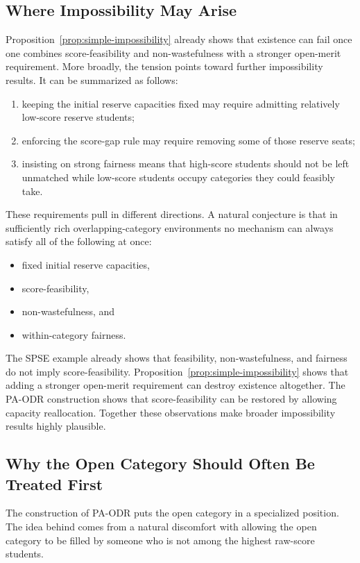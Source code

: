 \documentclass[12pt]{article}
\newcommand{\1}{\mathbf{1}}
\begin{document}
\subsection{Where Impossibility May Arise}
Proposition~\ref{prop:simple-impossibility} already shows that existence can fail once one combines score-feasibility and non-wastefulness with a stronger open-merit requirement. More broadly, the tension points toward further impossibility results. It can be summarized as follows:

\begin{enumerate}
\item keeping the initial reserve capacities fixed may require admitting relatively low-score reserve students;
\item enforcing the score-gap rule may require removing some of those reserve seats;
\item insisting on strong fairness means that high-score students should not be left unmatched while low-score students occupy categories they could feasibly take.
\end{enumerate}

These requirements pull in different directions. A natural conjecture is that in sufficiently rich overlapping-category environments no mechanism can always satisfy all of the following at once:
\begin{itemize}
\item fixed initial reserve capacities,
\item score-feasibility,
\item non-wastefulness, and
\item within-category fairness.
\end{itemize}

The SPSE example already shows that feasibility, non-wastefulness, and fairness do not imply score-feasibility. Proposition~\ref{prop:simple-impossibility} shows that adding a stronger open-merit requirement can destroy existence altogether. The PA-ODR construction shows that score-feasibility can be restored by allowing capacity reallocation. Together these observations make broader impossibility results highly plausible.

\subsection{Why the Open Category Should Often Be Treated First}
The construction of PA-ODR puts the open category in a specialized position. The idea behind comes from a natural discomfort with allowing the open category to be filled by someone who is not among the highest raw-score students.
\end{document}
